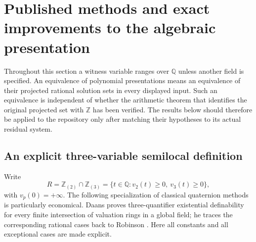 \section{Published methods and exact improvements to the algebraic presentation}
\label{sec:lit-optimization}

Throughout this section a witness variable ranges over $\mathbb Q$ unless
another field is specified. An equivalence of polynomial presentations means
an equivalence of their projected rational solution sets in every displayed
input. Such an equivalence is independent of whether the arithmetic theorem
that identifies the original projected set with $\mathbb Z$ has been verified.
The results below should therefore be applied to the repository only after
matching their hypotheses to its actual residual system.

\subsection{An explicit three-variable semilocal definition}

Write
\[
 R=\mathbb Z_{(2)}\cap\mathbb Z_{(3)}
   =\{t\in\mathbb Q:v_2(t)\ge0,\ v_3(t)\ge0\},
\]
with $v_p(0)=+\infty$. The following specialization of classical
quaternion methods is particularly economical. Daans proves three-quantifier
existential definability for every finite intersection of valuation rings
in a global field; he traces the corresponding rational cases back to
Robinson \cite[Proposition 4.2 and Remark 4.3]{Daans2024}.
Here all constants and all exceptional cases are made explicit.


